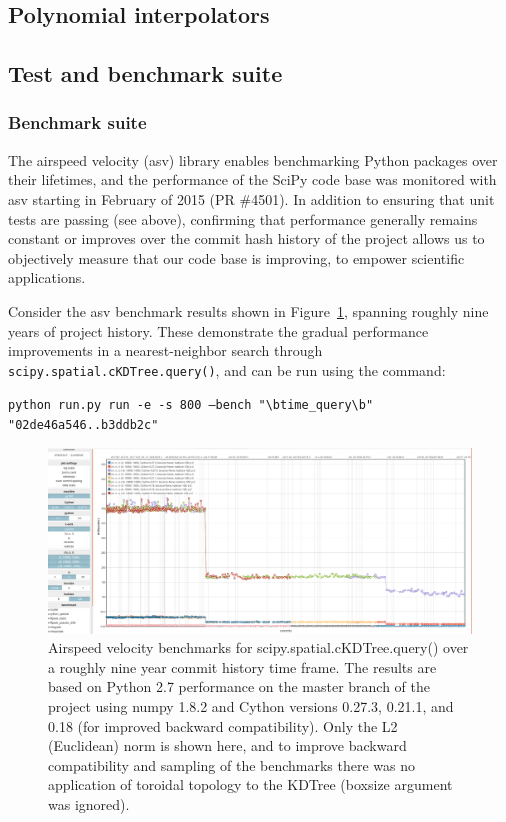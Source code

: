 \documentclass[fleqn,10pt]{wlscirep}
\begin{document}
\subsection*{Polynomial interpolators}


\subsection*{Test and benchmark suite}

    \subsubsection*{Benchmark suite}

    The airspeed velocity (asv) library enables benchmarking Python packages over their lifetimes, and the performance of the SciPy
    code base was monitored with asv starting in February of 2015 (PR \#4501). In addition to ensuring that unit tests are passing (see above),
    confirming that performance generally remains constant or improves over the commit hash history of the project allows us to objectively
    measure that our code base is improving, to empower scientific applications.

    Consider the asv benchmark results shown in Figure~\ref{fig:asvbench}, spanning roughly nine years of project history. These demonstrate the gradual performance
    improvements in a nearest-neighbor search through \texttt{scipy.spatial.cKDTree.query()}, and can be run using the command:


    \texttt{python run.py run -e -s 800 --bench "\textbackslash btime\_query\textbackslash b" "02de46a546..b3ddb2c"}

    \begin{figure}[H]
        \centering
        \includegraphics[width=\textwidth]{static/asv_time_query_ckdtree}
        \caption{Airspeed velocity benchmarks for scipy.spatial.cKDTree.query() over a roughly nine year commit history time frame. The results are based on Python 2.7 performance on the master branch of the project using numpy 1.8.2 and Cython versions 0.27.3, 0.21.1, and 0.18 (for improved backward compatibility). Only the L2 (Euclidean) norm is shown here, and to improve backward compatibility and sampling of the benchmarks there was no application of toroidal topology to the KDTree (boxsize argument was ignored).}
        \label{fig:asvbench}
    \end{figure}
\end{document}

